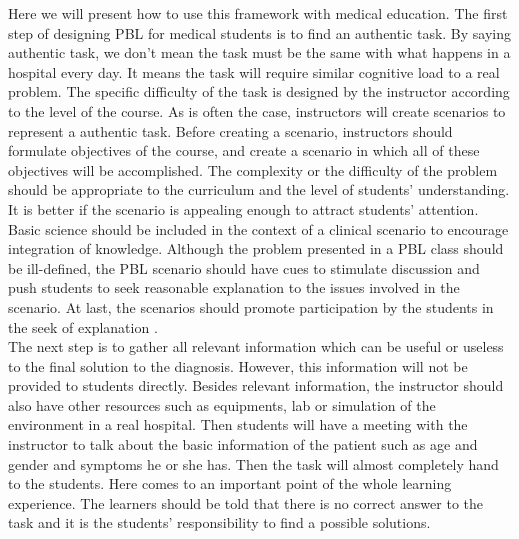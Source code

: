 \documentclass[sigconf]{acmart}
\begin{document}
Here we will present how to use this framework with medical education. 
The first step of designing PBL for medical students is to find an authentic task. By saying authentic task, we don’t mean the task must be the same with what happens in a hospital every day. It means the task will require similar cognitive load to a real problem. The specific difficulty of the task is designed by the instructor according to the level of the course. As is often the case, instructors will create scenarios to represent a authentic task. Before creating a scenario, instructors should formulate objectives of the course, and create a scenario in which all of these objectives will be accomplished. The complexity or the difficulty of the problem should be appropriate to the curriculum and the level of students' understanding. It is better if the scenario is appealing enough to attract students' attention. Basic science should be included in the context of a clinical scenario to encourage integration of knowledge. Although the problem presented in a PBL class should be ill-defined, the PBL scenario should have cues to stimulate discussion and push students to seek reasonable explanation to the issues involved in the scenario. At last, the scenarios should promote participation by the students in the seek of explanation \cite{Wood2003}.\\


The next step is to gather all relevant information which can be useful or useless to the final solution to the diagnosis. However, this information will not be provided to students directly. Besides relevant information, the instructor should also have other resources such as equipments, lab or simulation of the environment in a real hospital.
Then students will have a meeting with the instructor to talk about the basic information of the patient such as age and gender and symptoms he or she has. Then the task will almost completely hand to the students. Here comes to an important point of the whole learning experience. The learners should be told that there is no correct answer to the task and it is the students' responsibility to find a possible solutions.
\end{document}
